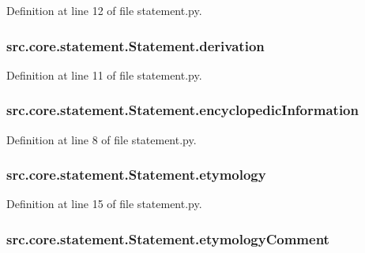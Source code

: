 Definition at line 12 of file statement.\+py.

\hypertarget{classsrc_1_1core_1_1statement_1_1_statement_a43c11e8a1f1b8dcf1c47138630ce9014}{
\subsubsection[{derivation}]{\setlength{\rightskip}{0pt plus 5cm}src.\+core.\+statement.\+Statement.\+derivation}}\label{classsrc_1_1core_1_1statement_1_1_statement_a43c11e8a1f1b8dcf1c47138630ce9014}


Definition at line 11 of file statement.\+py.

\hypertarget{classsrc_1_1core_1_1statement_1_1_statement_ac27bf20184c2fe3fc081af160a34b078}{
\subsubsection[{encyclopedic\+Information}]{\setlength{\rightskip}{0pt plus 5cm}src.\+core.\+statement.\+Statement.\+encyclopedic\+Information}}\label{classsrc_1_1core_1_1statement_1_1_statement_ac27bf20184c2fe3fc081af160a34b078}


Definition at line 8 of file statement.\+py.

\hypertarget{classsrc_1_1core_1_1statement_1_1_statement_a39257f2e47ab775116eae335c871f30d}{
\subsubsection[{etymology}]{\setlength{\rightskip}{0pt plus 5cm}src.\+core.\+statement.\+Statement.\+etymology}}\label{classsrc_1_1core_1_1statement_1_1_statement_a39257f2e47ab775116eae335c871f30d}


Definition at line 15 of file statement.\+py.

\hypertarget{classsrc_1_1core_1_1statement_1_1_statement_a75153a36438fe45f7b4c6da80dc2eb5b}{
\subsubsection[{etymology\+Comment}]{\setlength{\rightskip}{0pt plus 5cm}src.\+core.\+statement.\+Statement.\+etymology\+Comment}}\label{classsrc_1_1core_1_1statement_1_1_statement_a75153a36438fe45f7b4c6da80dc2eb5b}


